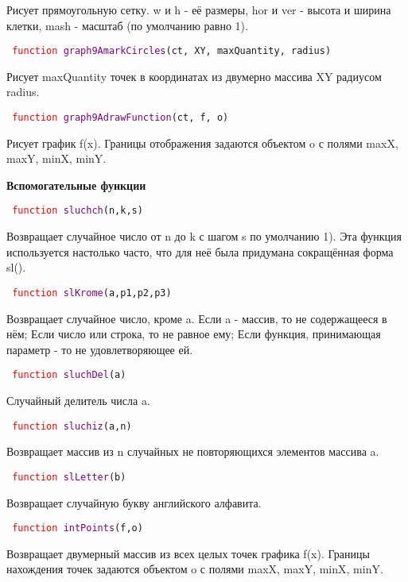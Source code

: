 Рисует прямоугольную сетку. w и h  \-- её размеры, hor и ver \-- высота и ширина клетки, mash - масштаб (по умолчанию равно 1).

\hypertarget{graph9AmarkCircles}{\texttt{
		\textcolor{Red}{function} \textcolor{Purple}{graph9AmarkCircles}(ct, XY, maxQuantity, radius)
	}}

Рисует maxQuantity точек в координатах из двумерно массива XY радиусом radius.

\hypertarget{graph9AdrawFunction}{\texttt{
		\textcolor{Red}{function} \textcolor{Purple}{graph9AdrawFunction}(ct, f, o)
	}}

Рисует график f(x). Границы отображения задаются объектом o с полями maxX, maxY, minX, minY.

\textbf{Вспомогательные функции}

\hypertarget{sluchch}{\texttt{
		\textcolor{Red}{function} \textcolor{Purple}{sluchch}(n,k,s)
	}}

Возвращает случайное число от n до k с шагом s по умолчанию 1).
Эта функция используется настолько часто, что для неё была придумана сокращённая форма sl().

\hypertarget{slKrome}{\texttt{
		\textcolor{Red}{function} \textcolor{Purple}{slKrome}(a,p1,p2,p3)
	}}

Возвращает случайное число, кроме a. Если a \-- массив, то не содержащееся в нём; Если число или строка, то не равное ему; Если функция, принимающая параметр - то не удовлетворяющее ей.

\texttt{
	\textcolor{Red}{function} \textcolor{Purple}{sluchDel}(a)
}

Случайный делитель числа a.

\texttt{
	\textcolor{Red}{function} \textcolor{Purple}{sluchiz}(a,n)
}

Возвращает массив из n случайных не повторяющихся элементов массива a.

\texttt{
	\textcolor{Red}{function} \textcolor{Purple}{slLetter}(b)
}

Возвращает случайную букву английского алфавита.%

\hypertarget{intPoints}{\texttt{
		\textcolor{Red}{function} \textcolor{Purple}{intPoints}(f,o)
	}}

Возвращает двумерный массив из всех целых точек графика f(x). Границы нахождения точек задаются объектом o с полями maxX, maxY, minX, minY.
\newpage
